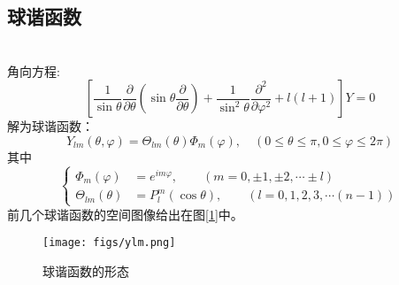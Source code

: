 	\subsection{球谐函数}
	~~\\ 
	角向方程:
		\begin{equation*}
			\left[ \frac{1}{ \sin \theta  } \frac{\partial }{\partial \theta } (\sin \theta \frac{\partial }{\partial \theta } )
			+\frac{1}{ \sin^2 \theta  } \frac{\partial^2}{\partial\varphi ^2} +l(l+1)\right] Y=0
		\end{equation*}	
	解为球谐函数：
		\begin{equation*}
			Y_{lm}(\theta,\varphi)= \Theta_{lm}(\theta) \Phi_m (\varphi), \quad ( 0 \le \theta \le \pi, 0 \le \varphi\le 2\pi)
		\end{equation*}	
	其中
		\begin{equation*} \left\{
			\begin{aligned}
				\Phi_m (\varphi) &= e^{im\varphi}, \qquad (m=0,\pm 1, \pm 2, \cdots \pm l) \\ 
				\Theta_{lm}(\theta)&= P^m  _{l}(\cos \theta), \qquad (l=0,1,2,3, \cdots (n-1)) 
			\end{aligned}\right.
		\end{equation*}
	前几个球谐函数的空间图像给出在图[\ref{fig:ylm}]中。
	
		\begin{figure}[h]
			\centering
			\texttt{[image: figs/ylm.png]}
			\caption{球谐函数的形态}
			\label{fig:ylm}
		\end{figure}
	
